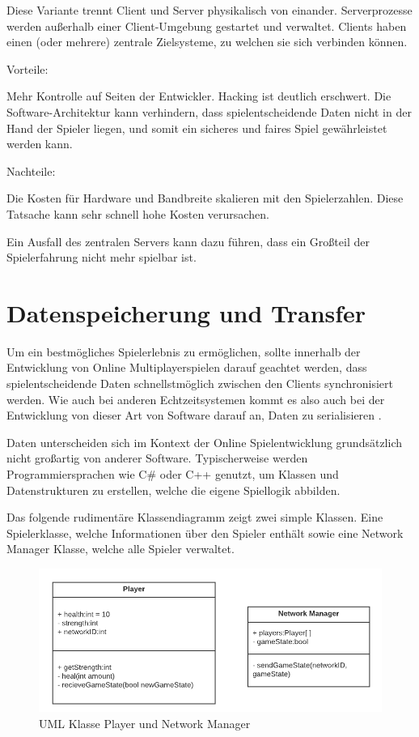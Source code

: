 Diese Variante trennt Client und Server physikalisch von einander. Serverprozesse werden außerhalb einer Client-Umgebung gestartet und verwaltet. Clients haben einen (oder mehrere) zentrale Zielsysteme, zu welchen sie sich verbinden können.

Vorteile: 

Mehr Kontrolle auf Seiten der Entwickler. Hacking ist deutlich erschwert. Die Software-Architektur kann verhindern, dass spielentscheidende Daten nicht in der Hand der Spieler liegen, und somit ein sicheres und faires Spiel gewährleistet werden kann.
\cite{Smed.2002}

Nachteile: 

Die Kosten für Hardware und Bandbreite skalieren mit den Spielerzahlen. Diese Tatsache kann sehr schnell hohe Kosten verursachen. \cite{Deng.2018}

Ein Ausfall des zentralen Servers kann dazu führen, dass ein Großteil der Spielerfahrung nicht mehr spielbar ist. 


\section{Datenspeicherung und Transfer}

Um ein bestmögliches Spielerlebnis zu ermöglichen, sollte innerhalb der Entwicklung von Online Multiplayerspielen darauf geachtet werden, dass spielentscheidende Daten schnellstmöglich zwischen den Clients synchronisiert werden. Wie auch bei anderen Echtzeitsystemen \cite{Wikipedia.2021} kommt es also auch bei der Entwicklung von dieser Art von Software darauf an, Daten zu serialisieren \cite{Wikipedia.2019}. 

Daten unterscheiden sich im Kontext der Online Spielentwicklung grundsätzlich nicht großartig von anderer Software. Typischerweise werden Programmiersprachen wie C\# oder C++ genutzt, um Klassen und Datenstrukturen zu erstellen, welche die eigene Spiellogik abbilden. \cite{Glinka.2008}

Das folgende rudimentäre Klassendiagramm zeigt zwei simple Klassen. Eine Spielerklasse, welche Informationen über den Spieler enthält sowie eine Network Manager Klasse, welche alle Spieler verwaltet.

\begin{figure}
	\centering
	\includegraphics[width=150mm]{images/UML_class_Player_NM.png}
	\caption[UML Klassen]{UML Klasse Player und Network Manager}
	\label{pic:UML_class_Player_NM}
\end{figure}

